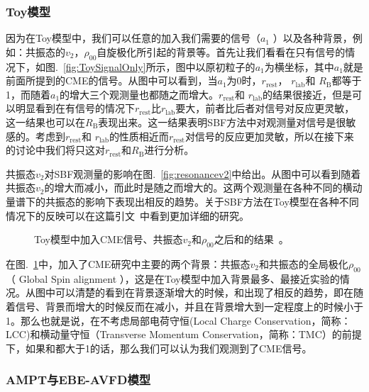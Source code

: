 \subsubsection{Toy模型}
因为在Toy模型中，我们可以任意的加入我们需要的信号（$a_{1}$ ）以及各种背景，例如：共振态的$v_2$，$\rho_{00}$自旋极化所引起的背景等。首先让我们看看在只有信号的情况下，如图.~\ref{fig:ToySignalOnly}所示，图中以原初粒子的$a_1$为横坐标，其中$a_1$就是前面所提到的CME的信号。从图中可以看到，当$a_1$为0时，$r_{\mathrm{rest}}$， $r_{\mathrm{lab}}$和 $R_{\mathrm{B}}$都等于1，而随着$a_1$的增大三个观测量也都随之而增大。$r_{\mathrm{rest}}$和 $r_{\mathrm{lab}}$的结果很接近，但是可以明显看到在有信号的情况下$r_{\mathrm{rest}}$比$r_{\mathrm{lab}}$要大，前者比后者对信号对反应更灵敏，这一结果也可以在$R_{\mathrm{B}}$表现出来。这一结果表明SBF方法中对观测量对信号是很敏感的。考虑到$r_{\mathrm{rest}}$和 $r_{\mathrm{lab}}$的性质相近而$r_{\mathrm{rest}}$对信号的反应更加灵敏，所以在接下来的讨论中我们将只这对$r_{\mathrm{rest}}$和$R_{\mathrm{B}}$进行分析。

共振态$v_2$对SBF观测量的影响在图.~\ref{fig:resonancev2}中给出。从图中可以看到\rb 随着共振态$v_2$的增大而减小，而此时\rrest 是随之而增大的。这两个观测量在各种不同的横动量谱下的共振态的影响下表现出相反的趋势。关于SBF方法在Toy模型在各种不同情况下的反映可以在这篇引文~\cite{Tang2020}中看到更加详细的研究。

\begin{figure}[htbp]
\centering
{}
\caption{Toy模型中加入CME信号、共振态$v_2$和$\rho_{00}$之后\rrest 和\rb 的结果~\cite{Lin2021}。}
\label{fig:resonancerho00}
\end{figure} 

在图.~\ref{fig:resonancerho00}中，加入了CME研究中主要的两个背景：共振态$v_2$和共振态的全局极化$\rho_{00}$（ Global Spin alignment ），这是在Toy模型中加入背景最多、最接近实验的情况。从图中可以清楚的看到在背景逐渐增大的时候，\rrest 和\rb 出现了相反的趋势，即在\rrest 随着信号、背景而增大的时候\rb 反而在减小，并且在背景增大到一定程度上的时候\rb 小于1。那么也就是说，在不考虑局部电荷守恒(Local Charge Conservation，简称：LCC)和横动量守恒（Transverse Momentum Conservation，简称：TMC）的前提下，如果\rrest 和\rb 都大于1的话，那么我们可以认为我们观测到了CME信号。


\subsubsection{AMPT与EBE-AVFD模型}

